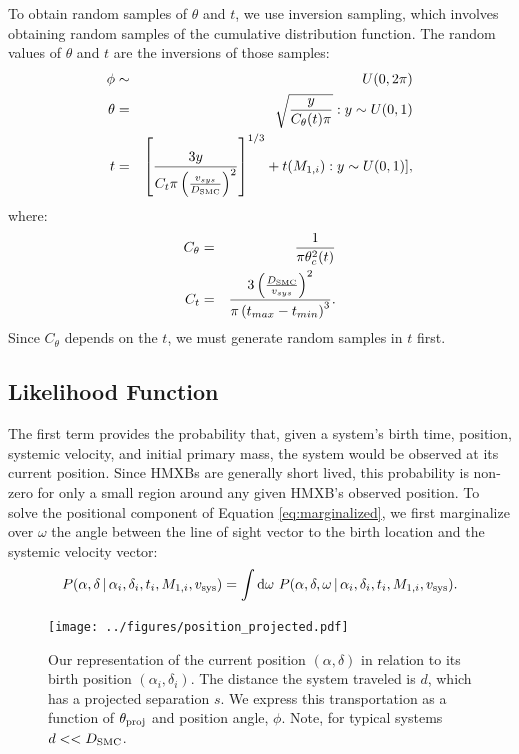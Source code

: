 \documentclass[12pt, preprint]{aastex}
\newcommand{\given}{\,|\,}
\newcommand{\dd}{\mathrm{d}}
\begin{document}
 To obtain random samples of $\theta$ and $t$, we use inversion sampling, which involves obtaining random samples of the cumulative distribution function. The random values of $\theta$ and $t$ are the inversions of those samples:
 \begin{eqnarray}
\phi &\sim& U(0, 2\pi) \\
\theta &=& \sqrt{\frac{y}{C_{\theta}(t) \pi}}: y \sim U(0,1) \\
t &=& \left[ \frac{3y}{C_t \pi \left( \frac{v_{sys}}{D_{\rm SMC}} \right)^2} \right]^{1/3} + t(M_{1,i}): y \sim U(0,1)], 
\end{eqnarray}
where:
\begin{eqnarray}
C_{\theta} &=& \frac{1}{\pi \theta_c^2(t)} \\
C_t &=& \frac{ 3 \left( \frac{D_{\rm SMC}}{v_{sys}} \right)^2 }{ \pi \left( t_{max} - t_{min} \right)^3 }.
\end{eqnarray}
Since $C_{\theta}$ depends on the $t$, we must generate random samples in $t$ first. 






\subsection{Likelihood Function} \label{sec:likelihood_indiv}

The first term provides the probability that, given a system's birth time, position, systemic velocity, and initial primary mass, the system would be observed at its current position. Since HMXBs are generally short lived, this probability is non-zero for only a small region around any given HMXB's observed position. To solve the positional component of Equation \ref{eq:marginalized}, we first marginalize over $\omega$ the angle between the line of sight vector to the birth location and the systemic velocity vector:
\begin{equation}
P(\alpha, \delta \given \alpha_i, \delta_i, t_i, M_{1,i}, v_{\rm sys} ) = \int \dd \omega\ P(\alpha, \delta, \omega \given \alpha_i, \delta_i, t_i, M_{1,i}, v_{\rm sys} ). \label{eq:P_pos_1}
\end{equation}

\begin{figure}[h!]
\begin{center}
\texttt{[image: ../figures/position\_projected.pdf]}
\caption{Our representation of the current position $(\alpha, \delta)$ in relation to its birth position $(\alpha_i, \delta_i)$. The distance the system traveled is $d$, which has a projected separation $s$. We express this transportation as a function of $\theta_{\rm proj}$ and position angle, $\phi$. Note, for typical systems $d << D_{\rm SMC}$.}
\label{fig:position_projection}
\end{center}
\end{figure}
\end{document}
